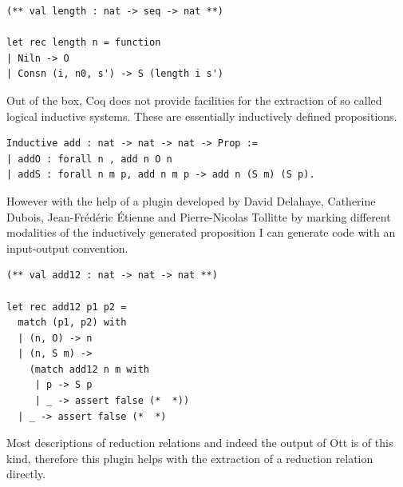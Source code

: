 \documentclass[12pt,twoside,notitlepage]{report}
\begin{document}
\begin{minipage}{\linewidth}

\begin{lstlisting}[caption={Coq to OCaml extraction of length}]
(** val length : nat -> seq -> nat **)

let rec length n = function
| Niln -> O
| Consn (i, n0, s') -> S (length i s')
\end{lstlisting}

\end{minipage}


Out of the box, Coq does not provide facilities for the extraction of so called logical inductive systems. These are essentially inductively defined propositions.


\begin{minipage}{\linewidth}

\begin{lstlisting}[language={Coq},caption={Coq logical inductive example}]
Inductive add : nat -> nat -> nat -> Prop :=
| addO : forall n , add n O n
| addS : forall n m p, add n m p -> add n (S m) (S p).
\end{lstlisting}

\end{minipage}

However with the help of a plugin developed by David Delahaye, Catherine Dubois, Jean-Fr\'ed\'eric \'Etienne and Pierre-Nicolas Tollitte \cite{delahaye2007extracting,tollitte2012producing} by marking different modalities of the inductively generated proposition I can generate code with an input-output convention.



\begin{minipage}{\linewidth}

\begin{lstlisting}[language={Coq},caption={Coq to OCaml extraction of a logical inductive relation}]
(** val add12 : nat -> nat -> nat **)

let rec add12 p1 p2 =
  match (p1, p2) with
  | (n, O) -> n
  | (n, S m) ->
    (match add12 n m with
     | p -> S p
     | _ -> assert false (*  *))
  | _ -> assert false (*  *)
\end{lstlisting}

\end{minipage}

Most descriptions of reduction relations and indeed the output of Ott is of this kind, therefore this plugin helps with the extraction of a reduction relation directly. 
\end{document}
